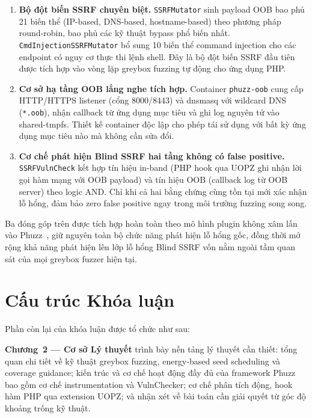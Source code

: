 \begin{enumerate}
    \item \textbf{Bộ đột biến SSRF chuyên biệt.} \texttt{SSRFMutator} sinh
    payload OOB bao phủ 21 biến thể (IP-based, DNS-based, hostname-based)
    theo phương pháp round-robin, bao phủ các kỹ thuật bypass phổ biến nhất.
    \texttt{CmdInjectionSSRFMutator} bổ sung 10 biến thể command injection
    cho các endpoint có nguy cơ thực thi lệnh shell. Đây là bộ đột biến SSRF
    đầu tiên được tích hợp vào vòng lặp greybox fuzzing tự động cho ứng
    dụng PHP.

    \item \textbf{Cơ sở hạ tầng OOB lắng nghe tích hợp.} Container
    \texttt{phuzz-oob} cung cấp HTTP/HTTPS listener (cổng 8000/8443) và
    dnsmasq với wildcard DNS (\texttt{*.oob}), nhận callback từ ứng dụng
    mục tiêu và ghi log nguyên tử vào shared-tmpfs. Thiết kế container độc
    lập cho phép tái sử dụng với bất kỳ ứng dụng mục tiêu nào mà không cần
    sửa đổi.

    \item \textbf{Cơ chế phát hiện Blind SSRF hai tầng không có false positive.}
    \texttt{SSRFVulnCheck} kết hợp tín hiệu in-band (PHP hook qua UOPZ ghi
    nhận lời gọi hàm mạng với OOB payload) và tín hiệu OOB (callback log
    từ OOB server) theo logic AND. Chỉ khi cả hai bằng chứng cùng tồn tại
    mới xác nhận lỗ hổng, đảm bảo zero false positive ngay trong môi trường
    fuzzing song song.
\end{enumerate}

Ba đóng góp trên được tích hợp hoàn toàn theo mô hình plugin không xâm lấn
vào Phuzz~\cite{neef2024phuzz}, giữ nguyên toàn bộ chức năng phát hiện lỗ
hổng gốc, đồng thời mở rộng khả năng phát hiện lên lớp lỗ hổng Blind SSRF
vốn nằm ngoài tầm quan sát của mọi greybox fuzzer hiện tại.

\section{Cấu trúc Khóa luận}
\label{sec:structure}

Phần còn lại của khóa luận được tổ chức như sau:

\textbf{Chương~2 --- Cơ sở Lý thuyết} trình bày nền tảng lý thuyết cần thiết: tổng
quan chi tiết về kỹ thuật greybox fuzzing, energy-based seed scheduling và coverage
guidance; kiến trúc và cơ chế hoạt động đầy đủ của framework Phuzz bao gồm cơ chế
instrumentation và VulnChecker; cơ chế phân tích động, hook hàm PHP qua extension
UOPZ; và nhận xét về bài toán cần giải quyết từ góc độ khoảng trống kỹ thuật.

